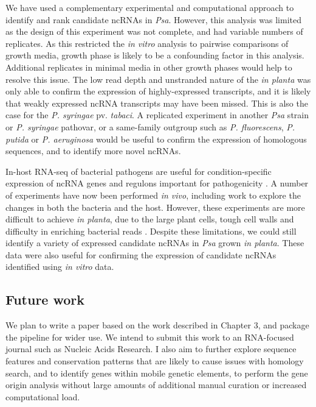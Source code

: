 We have used a complementary experimental and computational approach to identify and rank candidate ncRNAs in \textit{Psa}. However, this analysis was limited as the design of this experiment was not complete, and had variable numbers of replicates. As this restricted the \textit{in vitro} analysis to pairwise comparisons of growth media, growth phase is likely to be a confounding factor in this analysis. Additional replicates in minimal media in other growth phases would help to resolve this issue. The low read depth and unstranded nature of the \textit{in planta} was only able to confirm the expression of highly-expressed transcripts, and it is likely that weakly expressed ncRNA transcripts may have been missed. This is also the case for the \textit{P. syringae} pv. \textit{tabaci}. A replicated experiment in another \textit{Psa} strain or \textit{P. syringae} pathovar, or a same-family outgroup such as \textit{P. fluorescens}, \textit{P. putida} or \textit{P. aeruginosa} would be useful to confirm the expression of homologous sequences, and to identify more novel ncRNAs.

In-host RNA-seq of bacterial pathogens are useful for condition-specific expression of ncRNA genes and regulons important for pathogenicity \citep{Westermann2016-mxr}. A number of experiments have now been performed \textit{in vivo}, including work to explore the changes in both the bacteria and the host. However, these experiments are more difficult to achieve \textit{in planta}, due to the large plant cells, tough cell walls and difficulty in enriching bacterial reads \citep{Nobori2018-ux}. Despite these limitations, we could still identify a variety of expressed candidate ncRNAs in \textit{Psa} grown \textit{in planta}. These data were also useful for confirming the expression of candidate ncRNAs identified using \textit{in vitro} data. 


\subsection{Future work}

We plan to write a paper based on the work described in Chapter 3, and package the pipeline for wider use. We intend to submit this work to an RNA-focused journal such as Nucleic Acids Research. I also aim to further explore sequence features and conservation patterns that are likely to cause issues with homology search, and to identify genes within mobile genetic elements, to perform the gene origin analysis without large amounts of additional manual curation or increased computational load.  

